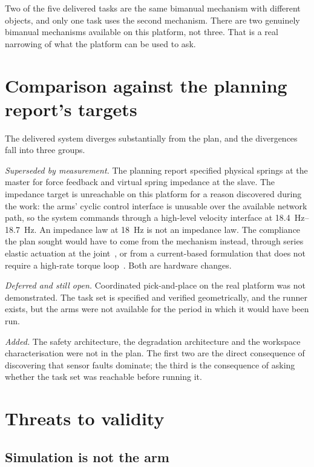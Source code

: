 Two of the five delivered tasks are the same bimanual mechanism with different
objects, and only one task uses the second mechanism. There are two genuinely
bimanual mechanisms available on this platform, not three. That is a real
narrowing of what the platform can be used to ask.

\section{Comparison against the planning report's targets}

The delivered system diverges substantially from the plan, and the divergences
fall into three groups.

\emph{Superseded by measurement.} The planning report specified physical
springs at the master for force feedback and virtual spring impedance at the
slave. The impedance target is unreachable on this platform for a reason
discovered during the work: the arms' cyclic control interface is unusable
over the available network path, so the system commands through a high-level
velocity interface at \SIrange{18.4}{18.7}{\hertz}. An impedance law at
\SI{18}{\hertz} is not an impedance law. The compliance the plan sought would
have to come from the mechanism instead, through series elastic actuation at
the joint~\cite{toubar2022sea,lee2019sea}, or from a current-based
formulation that does not require a high-rate torque
loop~\cite{dewolde2024impedance}. Both are hardware changes.

\emph{Deferred and still open.} Coordinated pick-and-place on the real
platform was not demonstrated. The task set is specified and verified
geometrically, and the runner exists, but the arms were not available for the
period in which it would have been run.

\emph{Added.} The safety architecture, the degradation architecture and the
workspace characterisation were not in the plan. The first two are the direct
consequence of discovering that sensor faults dominate; the third is the
consequence of asking whether the task set was reachable before running it.

\section{Threats to validity}

\subsection{Simulation is not the arm}

